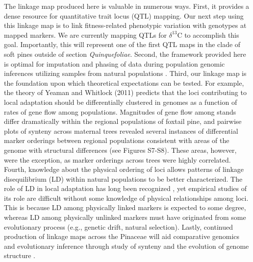 \documentclass[smallextended]{svjour3}
\begin{document}
The linkage map produced here is valuable in numerous ways. First, it provides a
dense resource for quantitative trait locus (QTL) mapping. Our next step using
this linkage map is to link fitness-related phenotypic variation with genotypes
at mapped markers. We are currently mapping QTLs for $\delta^{13}$C to
accomplish this goal. Importantly, this will represent one of the first QTL maps
in the clade of soft pines outside of section \textit{Quinquefoliae}. Second,
the framework provided here is optimal for imputation and phasing of data during
population genomic inferences utilizing samples from natural populations
\citep{Scheet:2006}.  Third, our linkage map is the foundation upon which
theoretical expectations can be tested.  For example, the theory of Yeaman and
Whitlock (2011) predicts that the loci contributing to local adaptation should
be differentially clustered in genomes as a function of rates of gene flow among
populations. Magnitudes of gene flow among stands differ dramatically within the
regional populations of foxtail pine, and pairwise plots of synteny across
maternal trees revealed several instances of differential marker orderings
between regional populations consistent with areas of the genome with structural
differences (see Figures S7-S8). These areas, however, were the exception, as
marker orderings across trees were highly correlated.  Fourth, knowledge about
the physical ordering of loci allows patterns of linkage disequilibrium (LD)
within natural populations to be better characterized. The role of LD in local
adaptation has long been recognized \citep[see][]{Akerman:2014}, yet empirical
studies of its role are difficult without some knowledge of physical
relationships among loci. This is because LD among physically linked markers is
expected to some degree, whereas LD among physically unlinked markers must have
originated from some evolutionary process (e.g., genetic drift, natural
selection). Lastly, continued production of linkage maps across the Pinaceae
will aid comparative genomics and evolutionary inference through study of
synteny and the evolution of genome structure \citep{Ritland:2011}.
\end{document}
